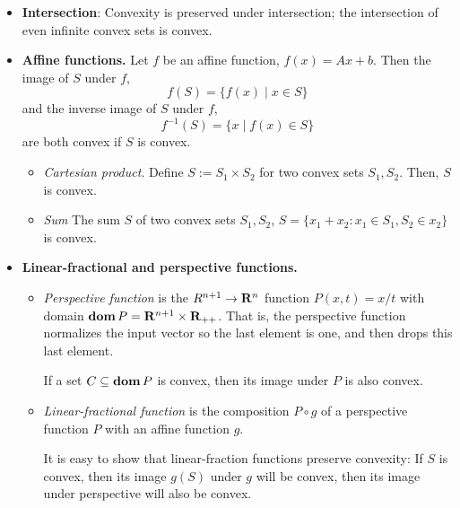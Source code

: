 \documentclass[a4paper, oneside]{book}
\begin{document}
\begin{itemize}
\item \textbf{Intersection}: Convexity is preserved under intersection; the intersection of even infinite convex sets is convex.
\item \textbf{Affine functions.} Let $f$ be an affine function, \ie $f(x)=Ax+b$. Then the image of $S$ under $f$, $$f(S) = \{f(x) \mid x \in S\}$$
and the inverse image of $S$ under $f$, $$f^{-1}(S) = \{x \mid f(x) \in S \}$$
are both convex if $S$ is convex.
	\begin{itemize}
	\item \textit{Cartesian product}. Define $S:=S_1\times S_2$ for two convex sets $S_1, S_2$. Then, $S$ is convex.
	\item \textit{Sum} The sum $S$ of two convex sets $S_1, S_2$, $S=\{x_1 + x_2 : x_1 \in S_1, S_2 \in x_2\}$ is convex.
	\end{itemize}
\item \textbf{Linear-fractional and perspective functions.} 
	\begin{itemize}
	\item \textit{Perspective function} is the $R^{n+1} \to \mathbf R^n $ function  $P(x,t) = x/t$ with domain $\textbf{dom}\,P = \mathbf R ^{n+1} \times \mathbf R_{++}$. That is, the perspective function normalizes the input vector so the last element is one, and then drops this last element.
	
	If a set $C \subseteq \textbf{dom}\,P$ is convex, then its image under $P$ is also convex. 
	\item \textit{Linear-fractional function} is the composition $P \circ g$ of a perspective function $P$ with an affine function $g$.
	
	It is easy to show that linear-fraction functions preserve convexity: If $S$ is convex, then  its image $g(S)$ under $g$ will be convex, then its image under perspective will also be convex. 
	\end{itemize}
\end{itemize}
\end{document}
